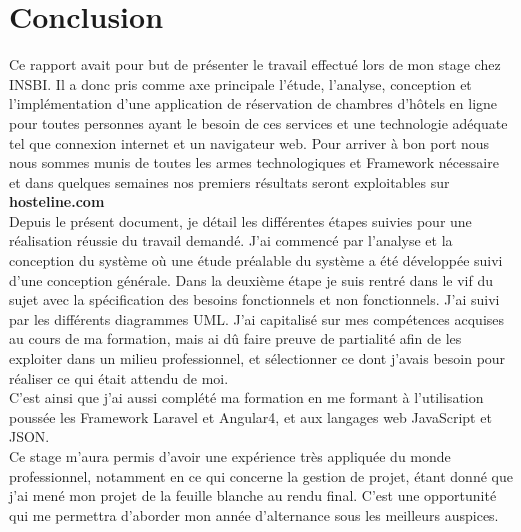 \chapter*{Conclusion}

Ce rapport avait pour but de présenter le travail effectué lors de mon stage chez INSBI. Il a donc pris comme axe principale l’étude, l’analyse, conception et l’implémentation d’une application de réservation de chambres d’hôtels en ligne pour toutes personnes ayant le besoin de ces services et une technologie adéquate tel que connexion internet et un navigateur web. Pour arriver à bon port nous nous sommes munis de toutes les armes technologiques et Framework nécessaire et dans quelques semaines nos premiers résultats seront exploitables sur \textbf{hosteline.com}\\

Depuis le présent document, je détail les différentes étapes suivies pour une réalisation réussie du travail demandé. J’ai commencé par l’analyse et la conception du système où une étude préalable du système a été développée suivi d’une conception générale. Dans la deuxième étape je suis rentré dans le vif du sujet avec la spécification des besoins fonctionnels et non fonctionnels. J’ai suivi par les différents diagrammes UML.
J’ai capitalisé sur mes compétences acquises au cours de ma formation, mais ai dû faire preuve de partialité afin de les exploiter dans un milieu professionnel, et sélectionner ce dont j’avais besoin pour réaliser ce qui était attendu de moi.\\

C’est ainsi que j’ai aussi complété ma formation en me formant à l’utilisation poussée les Framework Laravel et Angular4, et aux langages web JavaScript et JSON.\\

Ce stage m’aura permis d’avoir une expérience très appliquée du monde professionnel, notamment en ce qui concerne la gestion de projet, étant donné que j’ai mené mon projet de la feuille blanche au rendu final. C’est une opportunité qui me permettra d’aborder mon année d’alternance sous les meilleurs auspices.\\

